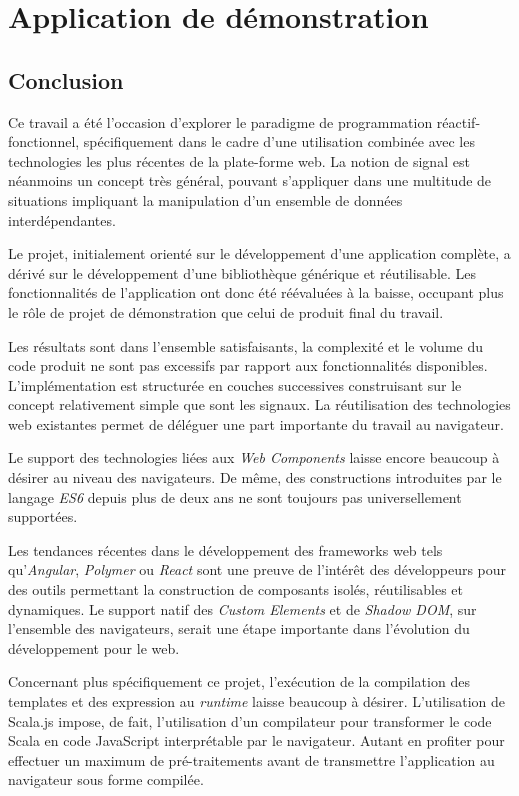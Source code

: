 \documentclass[11pt, a4paper, twoside, frenchb]{book}
\begin{document}
\part{Application de démonstration}


\chapter{Conclusion}

Ce travail a été l'occasion d'explorer le paradigme de programmation réactif-fonctionnel, spécifiquement dans le cadre d'une utilisation combinée avec les technologies les plus récentes de la plate-forme web. La notion de signal est néanmoins un concept très général, pouvant s'appliquer dans une multitude de situations impliquant la manipulation d'un ensemble de données interdépendantes.

Le projet, initialement orienté sur le développement d'une application complète, a dérivé sur le développement d'une bibliothèque générique et réutilisable. Les fonctionnalités de l'application ont donc été réévaluées à la baisse, occupant plus le rôle de projet de démonstration que celui de produit final du travail.

Les résultats sont dans l'ensemble satisfaisants, la complexité et le volume du code produit ne sont pas excessifs par rapport aux fonctionnalités disponibles. L'implémentation est structurée en couches successives construisant sur le concept relativement simple que sont les signaux. La réutilisation des technologies web existantes permet de déléguer une part importante du travail au navigateur.

Le support des technologies liées aux \emph{Web Components} laisse encore beaucoup à désirer au niveau des navigateurs. De même, des constructions introduites par le langage \emph{ES6} depuis plus de deux ans ne sont toujours pas universellement supportées.

Les tendances récentes dans le développement des frameworks web tels qu'\emph{Angular}, \emph{Polymer} ou \emph{React} sont une preuve de l'intérêt des développeurs pour des outils permettant la construction de composants isolés, réutilisables et dynamiques. Le support natif des \emph{Custom Elements} et de \emph{Shadow DOM}, sur l'ensemble des navigateurs, serait une étape importante dans l'évolution du développement pour le web.

Concernant plus spécifiquement ce projet, l'exécution de la compilation des templates et des expression au \emph{runtime} laisse beaucoup à désirer. L'utilisation de Scala.js impose, de fait, l'utilisation d'un compilateur pour transformer le code Scala en code JavaScript interprétable par le navigateur. Autant en profiter pour effectuer un maximum de pré-traitements avant de transmettre l'application au navigateur sous forme compilée.
\end{document}

